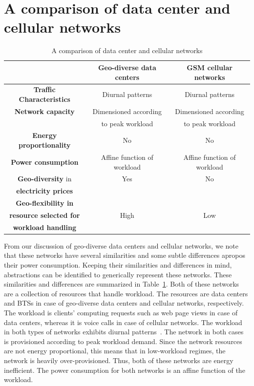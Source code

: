 \section{A comparison of data center and cellular networks} %
\label{sec:chap2:comparison}
\begin{table}
\begin{center}
\begin{tabular}{|c|c|c|}
\hline \ & \textbf{Geo-diverse data centers} & \textbf{GSM cellular networks} \\
\hline \textbf{Traffic Characteristics} & Diurnal patterns & Diurnal patterns \\
\hline \textbf{Network capacity} & Dimensioned according & Dimensioned according \\
\ & to peak workload & to peak workload \\
\hline \textbf{Energy proportionality} & No & No \\
\hline \textbf{Power consumption} & Affine function of workload & Affine function of workload \\
\hline \textbf{Geo-diversity} in & Yes & No \\
\textbf{electricity prices} & \ & \ \\
\hline \textbf{Geo-flexibility in} & \ & \ \\
\textbf{resource selected for} & High & Low \\
\textbf{workload handling} & \ & \ \\
\hline
\end{tabular}
\caption{A comparison of data center and cellular networks}
\label{tab:contrast}
\end{center}
\end{table}

From our discussion of geo-diverse data centers and cellular networks, we note that these networks have several similarities and some subtle differences apropos their power consumption. Keeping their similarities and differences in mind, abstractions can be identified to generically represent these networks. These similarities and differences are summarized in Table~\ref{tab:contrast}. Both of these networks are a collection of resources that handle workload. The resources are data centers and BTSs in case of geo-diverse data centers and cellular networks, respectively. The workload is clients' computing requests such as web page views in case of data centers, whereas it is voice calls in case of cellular networks. The workload in both types of networks exhibits diurnal patterns~\cite{10.1109/MC.2007.443,Peng:2011:BTSSaving:Mobicom}. The network in both cases is provisioned according to peak workload demand. Since the network resources are not energy proportional, this means that in low-workload regimes, the network is heavily over-provisioned. Thus, both of these networks are energy inefficient. The power consumption for both networks is an affine function of the workload. 

